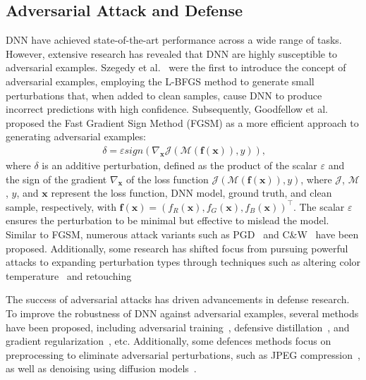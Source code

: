 \subsection{Adversarial Attack and Defense} \label{sec2.4}
DNN have achieved state-of-the-art performance across a wide range of tasks. However, extensive research has revealed that DNN are highly susceptible to adversarial examples. Szegedy et al.~\cite{szegedy2013intriguing} were the first to introduce the concept of adversarial examples, employing the L-BFGS method to generate small perturbations that, when added to clean samples, cause DNN to produce incorrect predictions with high confidence. Subsequently, Goodfellow et al.~\cite{goodfellow2014explaining} proposed the Fast Gradient Sign Method (FGSM) as a more efficient approach to generating adversarial examples:
\begin{equation}~\label{eq4}
\begin{gathered}
    \delta = \varepsilon sign\left( {{\nabla }_{\boldsymbol{x}}}\mathcal{J} \left( \mathcal{M}\left( \boldsymbol{f}(\boldsymbol{x}) \right),y \right) \right),
\end{gathered}
\end{equation}
where \(\delta\) is an additive perturbation, defined as the product of the scalar \(\varepsilon\) and the sign of the gradient \(\nabla_{\boldsymbol{x}}\) of the loss function \(\mathcal{J}(\mathcal{M}(\boldsymbol{f}(\boldsymbol{x})), y)\), where $\mathcal{J}$, $\mathcal{M}$, $y$, and $\boldsymbol{x}$ represent the loss function, DNN model, ground truth, and clean sample, respectively, with $\boldsymbol{f}(\boldsymbol{x}) = \left( f_R{(\boldsymbol{x})}, f_G{(\boldsymbol{x})}, f_B{(\boldsymbol{x})} \right)^\top$. The scalar \(\varepsilon\) ensures the perturbation to be minimal but effective to mislead the model. Similar to FGSM, numerous attack variants such as PGD~\cite{madry2018towards} and C\&W~\cite{carlini2017towards} have been proposed. Additionally, some research has shifted focus from pursuing powerful attacks to expanding perturbation types through techniques such as altering color temperature~\cite{afifi2019else} and retouching~\cite{xie2024retouchuaa}
\par The success of adversarial attacks has driven advancements in defense research. To improve the robustness of DNN against adversarial examples, several methods have been proposed, including adversarial training~\cite{madry2018towards}, defensive distillation~\cite{papernot2016distillation}, and gradient regularization~\cite{yan2018deep}, etc. Additionally, some defences methods focus on preprocessing to eliminate adversarial perturbations, such as JPEG compression~\cite{dziugaite2016study}, as well as denoising using diffusion models~\cite{nie2022diffusion}.
